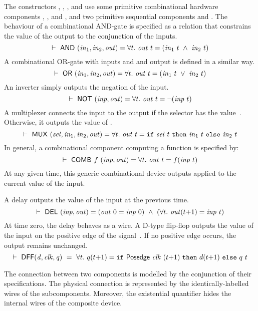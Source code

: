 \documentclass{llncs}
\begin{document}
The constructors ,
, ,  and  use
some primitive combinational hardware components
, ,  and , and
two primitive sequential components  and .
The behaviour of a combinational AND-gate
is specified as a relation that constrains the value of the output
to the conjunction of the inputs.
\[
\TURNST\ \DEF{AND}\ (\sVAR{in}{1},\sVAR{in}{2},\VAR{out}) = 
   \forall t.\ \VAR{out}\ t = (\sVAR{in}{1}\ t\ \AND\ \sVAR{in}{2}\ t)
\]
A combinational OR-gate with inputs  and 
and output  is defined in a similar way.
\[
\TURNST\ \DEF{OR}\ (\sVAR{in}{1},\sVAR{in}{2},\VAR{out}) = 
   \forall t.\ \VAR{out}\ t = (\sVAR{in}{1}\ t\ \OR\ \sVAR{in}{2}\ t)
\]
An inverter simply outputs the negation of the input.
\[
\vdash\ \mathsf{NOT}\ (\mathit{inp},\mathit{out}) = 
   \forall t.\ \mathit{out}\ t = \neg(\mathit{inp}\ t)
\]
A multiplexer connects the input 
to the output  if the selector  has the value~.
Otherwise, it outputs the value of .
\[
\TURNST\ \DEF{MUX}\ (\VAR{sel},\sVAR{in}{1},\sVAR{in}{2},\VAR{out}) = 
   \forall t.\ \VAR{out}\ t = \IF{\VAR{sel}\ t}{\sVAR{in}{1}\ t}{\sVAR{in}{2}\ t}
\]
In general, a combinational component computing a function  is specified by:
\[
\vdash\ \mathsf{COMB}\ f\ \mathit{(inp,out)} = \forall t.\ \mathit{out}\ t = f (\mathit{inp}\ t)
\]
At any given time, this generic combinational device
outputs  applied to the current value
of the input.

A delay outputs the value of the input at the previous time.
\[
\TURNST\ \DEF{DEL}\ (\VAR{inp},\VAR{out}) = 
    (\VAR{out}\ 0 = \VAR{inp}\ 0)\ \AND\ 
    (\forall t.\ \VAR{out} (t{+}1) = \VAR{inp}\ t)
\]
At time zero, the delay behaves as a wire.
A D-type flip-flop  outputs the value of the input  on the
positive edge of the signal~\VAR{clk}.
If no positive edge occurs, the output  remains
unchanged.
\[
\vdash\ \mathsf{DFF} (\mathit{d,clk,q})~ =~
 \forall t.\ q (t{+}1) =  \texttt{if}~\mathsf{Posedge}\ \mathit{clk}\ (t{+}1)~\texttt{then}~d (t{+}1)~\texttt{else}~q\ t
\]

The connection between two components is modelled
by the conjunction of their specifications.
The physical connection is represented by
the identically-labelled wires of the subcomponents.
Moreover,  the existential quantifier hides the 
internal wires of the composite device.
\end{document}
